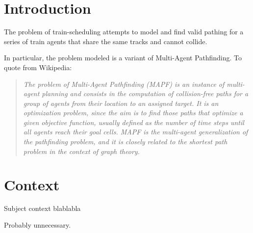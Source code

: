 \section{Introduction}
The problem of train-scheduling attempts to model and find valid pathing for a series of train agents that share the same tracks and cannot collide. 

In particular, the problem modeled is a variant of Multi-Agent Pathfinding. To quote from Wikipedia:
\begin{quote}
\emph{The problem of Multi-Agent Pathfinding (MAPF) is an instance of multi-agent planning and consists in the computation of collision-free paths for a group of agents from their location to an assigned target. It is an optimization problem, since the aim is to find those paths that optimize a given objective function, usually defined as the number of time steps until all agents reach their goal cells. MAPF is the multi-agent generalization of the pathfinding problem, and it is closely related to the shortest path problem in the context of graph theory.}
\end{quote}


\section{Context}

Subject context blablabla

\color{green} Probably unnecessary. \color{black}